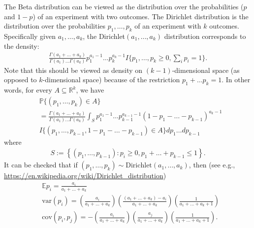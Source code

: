 \documentclass{scrartcl}
\newcommand{\E}{{\mathbb E}}
\newcommand{\R}{{\mathbb R}}
\renewcommand{\P}{{\mathbb P}}
\begin{document}
The Beta distribution can be viewed as the distribution over the
probabilities ($p$ and $1-p$) of an experiment with two outcomes. The Dirichlet
distribution is the distribution over the probabilities $p_1, \dots,
p_k$ of an experiment with $k$ outcomes. Specifically given $a_1,
\dots, a_k$, the Dirichlet$(a_1, \dots, a_k)$ distribution corresponds
to the density:
\begin{align*}
  \frac{\Gamma(a_1 + \dots + a_k)}{\Gamma(a_1) \dots \Gamma(a_k)}
  p_1^{a_1 - 1} \dots p_k^{a_k - 1} I\{p_1, \dots, p_k \geq 0,
  \sum_{i} p_i = 1\}.  
\end{align*}
Note that this should be viewed as density on $(k-1)$-dimensional
space (as opposed to $k$-dimensional space) because of the restriction
$p_1 + \dots p_k = 1$. In other words, for every $A \subseteq \R^k$,
we have
\begin{align*}
  &  \P\{(p_1, \dots, p_k) \in A\} \\
  &=  \frac{\Gamma(a_1 + \dots + a_k)}{\Gamma(a_1) \dots \Gamma(a_k)} \int_S  
  p_1^{a_1 - 1} \dots p_{k-1}^{a_{k-1} - 1} \left(1 - p_1 - \dots -
    p_{k-1} \right)^{a_k - 1} \\ &I\{(p_1, \dots, p_{k-1}, 1 - p_1 - \dots -
                                   p_{k-1}) \in A\} dp_1 \dots 
    dp_{k-1}
\end{align*}
where
\begin{align*}
  S := \left\{(p_1, \dots, p_{k-1}) : p_{i} \geq 0, p_1 + \dots +
  p_{k-1} \leq 1 \right\}. 
\end{align*}
It can be checked that if $(p_1, \dots, p_k) \sim
\text{Dirichlet}(a_1, \dots, a_k)$, then (see e.g.,
\url{https://en.wikipedia.org/wiki/Dirichlet_distribution}) 
\begin{align*}
  &\E p_i = \frac{a_i}{a_1 + \dots + a_k} \\ & \text{var}(p_i) =
                                               \left(\frac{a_i}{a_1 + \dots
                                               + a_k} \right) \left( \frac{(a_1 +
                                               \dots + a_k) - a_i}{a_1
                                               + \dots + a_k} \right) \left(
                                               \frac{1}{a_1 + \dots +
                                               a_k + 1} \right) \\
  &\text{cov}(p_i, p_j) = -\left(\frac{a_i}{a_1 + \dots + a_k} \right) \left(
    \frac{a_j}{a_1 + \dots + a_k} \right) \left( \frac{1}{a_1 + \dots
    + a_k + 1} \right). 
\end{align*}
\end{document}
